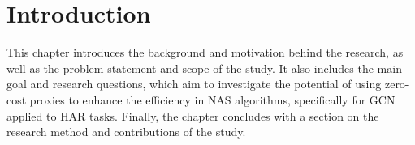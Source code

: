 \chapter{Introduction}
This chapter introduces the background and motivation behind the research, as well as the problem statement and scope of the study. It also includes the main goal and research questions, which aim to investigate the potential of using zero-cost proxies to enhance the efficiency in \gls{NAS} algorithms, specifically for \gls{GCN} applied to \gls{HAR} tasks. Finally, the chapter concludes with a section on the research method and contributions of the study.








